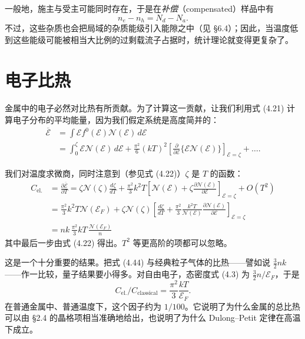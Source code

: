 一般地，施主与受主可能同时存在，于是在\emph{补偿}（compensated）样品中有
\begin{equation*}
n_e - n_h = N_d - N_a.
\tag{4.42}
\end{equation*}
不过，这些杂质也会把局域的杂质能级引入能隙之中（见 §6.4）；因此，当温度低到这些能级可能被相当大比例的过剩载流子占据时，统计理论就变得更复杂了。

\section{电子比热}

金属中的电子必然对比热有所贡献。为了计算这一贡献，让我们利用式 (4.21) 计算电子分布的平均能量，因为我们假定系统是高度简并的：
\begin{align*}
\overline{\mathcal{E}} &= \int \mathcal{E}f^0(\mathcal{E})\mathcal{N}(\mathcal{E})\,d\mathcal{E} \\
&= \int_0^{\zeta} \mathcal{E}\mathcal{N}(\mathcal{E})\,d\mathcal{E} + \frac{\pi^2}{6}(kT)^2\left[\frac{\partial}{\partial \mathcal{E}}\{\mathcal{E}\mathcal{N}(\mathcal{E})\}\right]_{\mathcal{E}=\zeta} + \ldots.
\tag{4.43}
\end{align*}

我们对温度求微商，同时注意到（参见式 (4.22)）$\zeta$ 是 $T$ 的函数：
\begin{align*}
C_{\mathrm{el.}} &= \frac{\partial \overline{\mathcal{E}}}{\partial T} = \zeta\mathcal{N}(\zeta)\frac{d\zeta}{dT} + \frac{\pi^2}{3}k^2T\left[\mathcal{N}(\mathcal{E}) + \zeta\frac{\partial \mathcal{N}(\mathcal{E})}{\partial \mathcal{E}}\right]_{\mathcal{E}=\zeta} + O(T^2) \\
&= \frac{\pi^2}{3}k^2T\mathcal{N}(\mathcal{E}_F) + \zeta\mathcal{N}(\zeta)\left[\frac{d\zeta}{dT} + \frac{\pi^2}{3}\frac{k^2T}{\mathcal{N}(\mathcal{E})}\frac{\partial \mathcal{N}(\mathcal{E})}{\partial \mathcal{E}}\right]_{\mathcal{E}=\zeta} \\
&= nk\,\frac{\pi^2}{3}kT\,\frac{\mathcal{N}(\mathcal{E}_F)}{n}
\tag{4.44}
\end{align*}
其中最后一步由式 (4.22) 得出。$T^2$ 等更高阶的项都可以忽略。

这是一个十分重要的结果。把式 (4.44) 与经典粒子气体的比热——譬如说 $\frac{3}{2}nk$——作一比较，量子结果要小得多。对自由电子，态密度式 (4.3) 为 $\frac{3}{2}n/\mathcal{E}_F$，于是
\begin{equation*}
C_{\mathrm{el.}}/C_{\mathrm{classical}} = \frac{\pi^2}{3}\frac{kT}{\mathcal{E}_F}.
\tag{4.45}
\end{equation*}
在普通金属中、普通温度下，这个因子约为 $1/100$。它说明了为什么金属的总比热可以由 §2.4 的晶格项相当准确地给出，也说明了为什么 Dulong–Petit 定律在高温下成立。

